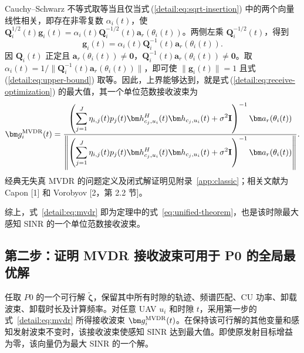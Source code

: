 Cauchy--Schwarz 不等式取等当且仅当式\,(\ref{detail:eq:sqrt-insertion}) 中的两个向量线性相关，即存在非零复数 $\alpha_i(t)$，使 $\mathbf Q_i^{1/2}(t)\bm g_i(t)=\alpha_i(t)\mathbf Q_i^{-1/2}(t)\bm a_r(\theta_i(t))$。两侧左乘 $\mathbf Q_i^{-1/2}(t)$，得到
\begin{equation}\label{detail:eq:direction}
\bm g_i(t)=\alpha_i(t)\mathbf Q_i^{-1}(t)\bm a_r(\theta_i(t)).
\end{equation}
因 $\mathbf Q_i(t)$ 正定且 $\bm a_r(\theta_i(t))\ne\bm0$，$\mathbf Q_i^{-1}(t)\bm a_r(\theta_i(t))\ne\bm0$。取 $\alpha_i(t)=1/\|\mathbf Q_i^{-1}(t)\bm a_r(\theta_i(t))\|$，即可使 $\|\bm g_i(t)\|=1$ 且式\,(\ref{detail:eq:upper-bound}) 取等。因此，上界能够达到，就是式\,(\ref{detail:eq:receive-optimization}) 的最大值，其一个单位范数接收波束为
\begin{equation}\label{detail:eq:mvdr}
\bm g_i^{\rm MVDR}(t)=
\frac{\left(\displaystyle\sum_{j=1}^J\eta_{i,j}(t)p_j(t)
\bm h_{c_j,u_i}^{H}(t)\bm h_{c_j,u_i}(t)+\sigma^2\mathbf I\right)^{-1}
\bm a_r(\theta_i(t))}
{\left\|\left(\displaystyle\sum_{j=1}^J\eta_{i,j}(t)p_j(t)
\bm h_{c_j,u_i}^{H}(t)\bm h_{c_j,u_i}(t)+\sigma^2\mathbf I\right)^{-1}
\bm a_r(\theta_i(t))\right\|}.
\end{equation}
经典无失真 MVDR 的问题定义及闭式解证明见附录~\ref{app:classic}；相关文献为 Capon [1] 和 Vorobyov [2，第 2.2 节]。




综上，式~\eqref{detail:eq:mvdr} 即为定理中的式~\eqref{eq:unified-theorem}，也是该时隙最大感知 SINR 的一个单位范数接收波束。



\subsection{第二步：证明 MVDR 接收波束可用于 P0 的全局最优解}

任取 $P0$ 的一个可行解 $\tilde{\bm\zeta}$，保留其中所有时隙的轨迹、频谱匹配、CU 功率、卸载波束、卸载时长及计算频率。对任意 UAV $u_i$ 和时隙 $t$，采用第一步的式~\eqref{detail:eq:mvdr} 所得接收波束 $\bm g_i^{\rm MVDR}(t)$。在保持该可行解的其他变量和感知发射波束不变时，该接收波束使感知 SINR 达到最大值。即使原发射目标增益为零，该向量仍为最大 SINR 的一个解。

